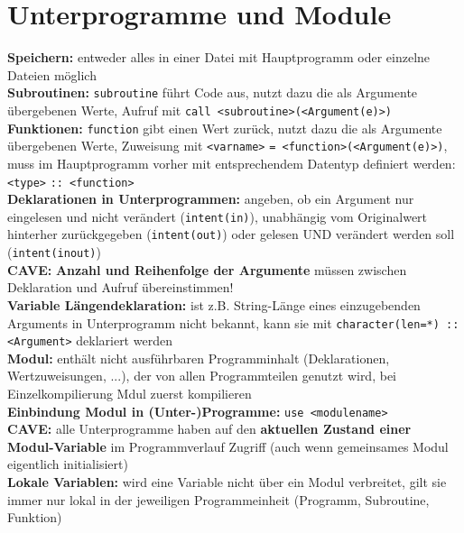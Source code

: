\documentclass[a4paper, twocolumn]{scrarticle}
\begin{document}
\section{Unterprogramme und Module}
\textbf{Speichern:} entweder alles in einer Datei mit Hauptprogramm oder einzelne Dateien möglich\\
\textbf{Subroutinen:} \lstinline|subroutine| führt Code aus, nutzt dazu die als Argumente übergebenen Werte, Aufruf mit \lstinline|call <subroutine>(<Argument(e)>)|\\
\textbf{Funktionen:} \lstinline|function| gibt einen Wert zurück, nutzt dazu die als Argumente übergebenen Werte, Zuweisung mit \lstinline|<varname>| \lstinline|= <function>(<Argument(e)>)|, muss im Hauptprogramm vorher mit entsprechendem Datentyp definiert werden: \lstinline|<type>| \lstinline|:: <function>|\\
\textbf{Deklarationen in Unterprogrammen:}  angeben, ob ein Argument nur eingelesen und nicht verändert (\lstinline|intent(in)|), unabhängig vom Originalwert hinterher zurückgegeben (\lstinline|intent(out)|) oder gelesen UND verändert werden soll (\lstinline|intent(inout)|)\\
\textbf{CAVE:} \textbf{Anzahl und Reihenfolge der Argumente} müssen zwischen Deklaration und Aufruf übereinstimmen!\\
\textbf{Variable Längendeklaration:} ist z.B. String-Länge  eines einzugebenden Arguments in Unterprogramm nicht bekannt, kann sie mit \lstinline|character(len=*) :: <Argument>| deklariert werden\\
\textbf{Modul:} enthält nicht ausführbaren  Programminhalt (Deklarationen, Wertzuweisungen, ...), der von allen Programmteilen genutzt wird, bei Einzelkompilierung  Mdul zuerst kompilieren\\
\textbf{Einbindung Modul in (Unter-)Programme:} \lstinline|use <modulename>|\\
\textbf{CAVE:} alle Unterprogramme haben auf den \textbf{aktuellen Zustand einer Modul-Variable} im Programmverlauf Zugriff (auch wenn gemeinsames Modul eigentlich initialisiert)\\
\textbf{Lokale Variablen:} wird eine Variable nicht über ein Modul \glqq verbreitet\grqq, gilt sie immer nur lokal in der jeweiligen Programmeinheit (Programm, Subroutine, Funktion)
\end{document}
